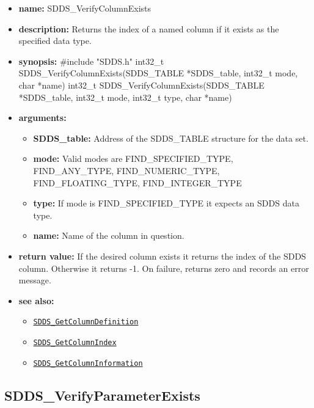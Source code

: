 \documentclass[11pt]{article}
\newcommand{\progref}[1]{\hyperref[SDDS_#1]{\tt SDDS\_#1}}
\begin{document}
\begin{itemize}
\item {\bf name:}\newline
SDDS\_VerifyColumnExists
\item {\bf description:}\newline
Returns the index of a named column if it exists as the specified data type.
\item {\bf synopsis:} \#include "SDDS.h"\newline
int32\_t SDDS\_VerifyColumnExists(SDDS\_TABLE *SDDS\_table, int32\_t mode, char *name)
int32\_t SDDS\_VerifyColumnExists(SDDS\_TABLE *SDDS\_table, int32\_t mode, int32\_t type, char *name)
\item {\bf arguments:}
\begin{itemize}
\item {\bf SDDS\_table:} Address of the SDDS\_TABLE structure for the data set.
\item {\bf mode:} Valid modes are FIND\_SPECIFIED\_TYPE, FIND\_ANY\_TYPE, FIND\_NUMERIC\_TYPE, FIND\_FLOATING\_TYPE, FIND\_INTEGER\_TYPE
\item {\bf type:} If mode is FIND\_SPECIFIED\_TYPE it expects an SDDS data type.
\item {\bf name:} Name of the column in question.
\end{itemize}
\item {\bf return value:}\newline
If the desired column exists it returns the index of the SDDS column. Otherwise it returns -1.\newline
\newline
On failure, returns zero and records an error message. 
\item {\bf see also:}
\begin{itemize}
\item \progref{GetColumnDefinition}
\item \progref{GetColumnIndex}
\item \progref{GetColumnInformation}
\end{itemize}
\end{itemize}

\subsection{SDDS\_VerifyParameterExists}
\label{SDDS_VerifyParameterExists}
\end{document}

